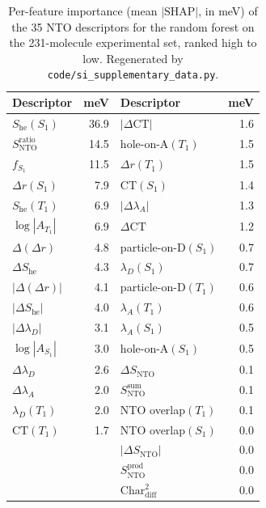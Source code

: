 \documentclass[final,3p,times,twocolumn]{elsarticle}
\begin{document}
\begin{table}[htbp]
  \centering
  \caption{Per-feature importance (mean $|\text{SHAP}|$, in meV) of the \num{35}
    NTO descriptors for the random forest on the \num{231}-molecule experimental
    set, ranked high to low. Regenerated by
    \texttt{code/si\_supplementary\_data.py}.}
  \label{tab:shap}
  \small
  \begin{tabular}{lr@{\hskip 2em}lr}
    \toprule
    Descriptor & meV & Descriptor & meV \\
    \midrule
    $S_\text{he}(S_1)$        & 36.9 & $|\Delta\text{CT}|$            & 1.6 \\
    $S_\text{NTO}^{\text{ratio}}$ & 14.5 & hole-on-A$(T_1)$          & 1.5 \\
    $f_{S_1}$                 & 11.5 & $\Delta r(T_1)$               & 1.5 \\
    $\Delta r(S_1)$           &  7.9 & $\text{CT}(S_1)$              & 1.4 \\
    $S_\text{he}(T_1)$        &  6.9 & $|\Delta\lambda_A|$          & 1.3 \\
    $\log|A_{T_1}|$           &  6.9 & $\Delta\text{CT}$            & 1.2 \\
    $\Delta(\Delta r)$        &  4.8 & particle-on-D$(S_1)$         & 0.7 \\
    $\Delta S_\text{he}$      &  4.3 & $\lambda_D(S_1)$             & 0.7 \\
    $|\Delta(\Delta r)|$      &  4.1 & particle-on-D$(T_1)$         & 0.6 \\
    $|\Delta S_\text{he}|$    &  4.0 & $\lambda_A(T_1)$             & 0.6 \\
    $|\Delta\lambda_D|$       &  3.1 & $\lambda_A(S_1)$             & 0.5 \\
    $\log|A_{S_1}|$           &  3.0 & hole-on-A$(S_1)$             & 0.5 \\
    $\Delta\lambda_D$         &  2.6 & $\Delta S_\text{NTO}$        & 0.1 \\
    $\Delta\lambda_A$         &  2.0 & $S_\text{NTO}^{\text{sum}}$  & 0.1 \\
    $\lambda_D(T_1)$          &  2.0 & NTO overlap$(T_1)$           & 0.1 \\
    $\text{CT}(T_1)$          &  1.7 & NTO overlap$(S_1)$           & 0.0 \\
    \multicolumn{2}{l}{} & $|\Delta S_\text{NTO}|$         & 0.0 \\
    \multicolumn{2}{l}{} & $S_\text{NTO}^{\text{prod}}$    & 0.0 \\
    \multicolumn{2}{l}{} & $\text{Char}_\text{diff}^2$    & 0.0 \\
    \bottomrule
  \end{tabular}
\end{table}
\end{document}
